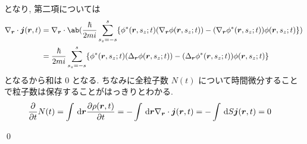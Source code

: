 \documentclass[uplatex,dvipdfmx,a4paper,11pt]{jlreq}
\makeatletter
\newcommand{\rr}{\bm{r}}
\numberwithin{equation}{section}
\theoremstyle{definition}
\renewenvironment{proof}[1][\proofname]{\par
  \normalfont
  \topsep6\p@\@plus6\p@ \trivlist
  \item[\hskip\labelsep{\bfseries #1}\@addpunct{\bfseries}]\ignorespaces\quad\par
}{
  \qed\endtrivlist\@endpefalse
}
\renewcommand\proofname{証明}
\makeatother
\begin{document}
\begin{proof}
  となり, 第二項については
  \begin{align}
    \nabla_{\rr}\cdot\bm{j}(\rr, t) & = \nabla_{\rr}\cdot\ab(\frac{\hbar}{2mi}\sum_{s_z = -s}^{s}\{\phi^*(\rr, s_z; t)(\nabla_{\rr}\phi(\rr, s_z; t)) - (\nabla_{\rr}\phi^*(\rr, s_z; t))\phi(\rr, s_z; t)\}) \\
                                    & = \frac{\hbar}{2mi}\sum_{s_z = -s}^{s}\{\phi^*(\rr, s_z; t)(\Delta_{\rr}\phi(\rr, s_z; t)) - (\Delta_{\rr}\phi^*(\rr, s_z; t))\phi(\rr, s_z; t)\}
  \end{align}
  となるから和は $0$ となる. ちなみに全粒子数 $N(t)$ について時間微分することで粒子数は保存することがはっきりとわかる.
  \begin{align}
    \diffp{}{t}N(t) & = \int\dl{\rr}\diffp{\rho(\rr, t)}{t} = -\int\dl{\rr}\nabla_{\rr}\cdot\bm{j}(\rr, t) = -\int\dl{S}\bm{j}(\rr, t) = 0
  \end{align}
\end{proof}
\end{document}
